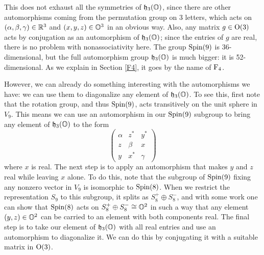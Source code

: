 This does not exhaust all the symmetries of ${\mathfrak {h}}_3({\mathbb O})$, since there are 
other automorphisms coming from the permutation group on 3 letters, 
which acts on $(\alpha,\beta,\gamma) \in {\mathbb R}^3$ and $(x,y,z) \in {\mathbb O}^3$ in 
an obvious way.  Also, any matrix $g \in {\rm O}(3)$ acts by conjugation as 
an automorphism of ${\mathfrak {h}}_3({\mathbb O})$; since the entries of $g$ are real, there 
is no problem with nonassociativity here.   The group ${\rm Spin}(9)$ is 
36-dimensional, but the full automorphism group ${\mathfrak {h}}_3({\mathbb O})$ is much  
bigger: it is 52-dimensional.  As we explain in Section \ref{F4}, it 
goes by the name of ${\rm F}_4$. 

However, we can already do something interesting with the automorphisms 
we have: we can use them to diagonalize any element of ${\mathfrak {h}}_3({\mathbb O})$.   To 
see this, first note that the rotation group, and thus ${\rm Spin}(9)$, acts 
transitively on the unit sphere in $V_9$.  This means we can use an  
automorphism in our ${\rm Spin}(9)$ subgroup to bring any element of ${\mathfrak {h}}_3({\mathbb O})$ 
to the form 
\[ 
\left( \begin{array}{ccc}  
                         \alpha  &  z^*  & y^*         \\  
                         z       & \beta & x           \\ 
                         y       & x^* & \gamma   \end{array} \right)  
\]  
where $x$ is real.   The next step is to apply an automorphism 
that makes $y$ and $z$ real while leaving $x$ alone.  To do this, note 
that the subgroup of ${\rm Spin}(9)$ fixing any nonzero vector in $V_9$ is 
isomorphic to ${\rm Spin}(8)$.  When we restrict the representation $S_9$ to 
this subgroup, it splits as $S_8^+ \oplus S_8^-$, and with some work 
\cite{Harvey} one can show that ${\rm Spin}(8)$ acts on $S_8^+ \oplus S_8^- 
\cong {\mathbb O}^2$ in such a way that any element $(y,z) \in {\mathbb O}^2$ can be 
carried to an element with both components real.  The final step is to 
take our element of ${\mathfrak {h}}_3({\mathbb O})$ with all real entries and use an 
automorphism to diagonalize it.  We can do this by conjugating it with a 
suitable matrix in ${\rm O}(3)$.   
 
